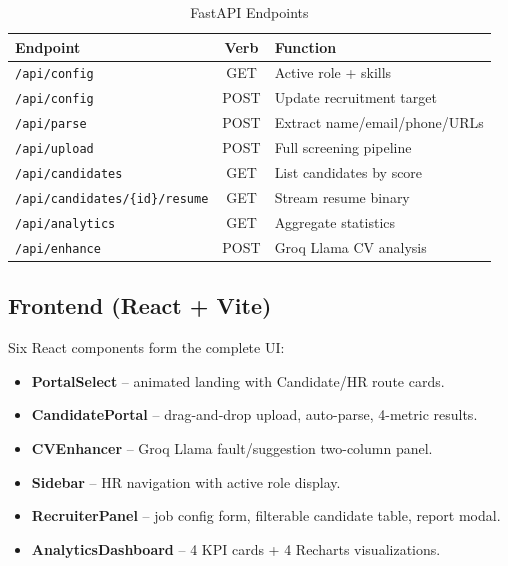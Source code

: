 \documentclass[10pt,twocolumn]{article}
\begin{document}
\begin{table}[H]
\centering
\caption{FastAPI Endpoints}
\label{tab:api}
\small
\setlength{\tabcolsep}{3pt}
\begin{tabular}{@{}L{2.2cm}cL{3.0cm}@{}}
\toprule
{}\textbf{Endpoint} & \textbf{Verb} & \textbf{Function} \\
\midrule
\texttt{/api/config}          & GET   & Active role + skills \\
\texttt{/api/config}          & POST  & Update recruitment target \\
\texttt{/api/parse}           & POST  & Extract name/email/phone/URLs \\
\texttt{/api/upload}          & POST  & Full screening pipeline \\
\texttt{/api/candidates}      & GET   & List candidates by score \\
\texttt{/api/candidates/\{id\}/resume} & GET & Stream resume binary \\
\texttt{/api/analytics}       & GET   & Aggregate statistics \\
\texttt{/api/enhance}         & POST  & Groq Llama CV analysis \\
\bottomrule
\end{tabular}
\end{table}

\subsection{Frontend (React + Vite)}

Six React components form the complete UI:
\begin{itemize}
  \item \textbf{PortalSelect} -- animated landing with Candidate/HR route cards.
  \item \textbf{CandidatePortal} -- drag-and-drop upload, auto-parse, 4-metric results.
  \item \textbf{CVEnhancer} -- Groq Llama fault/suggestion two-column panel.
  \item \textbf{Sidebar} -- HR navigation with active role display.
  \item \textbf{RecruiterPanel} -- job config form, filterable candidate table, report modal.
  \item \textbf{AnalyticsDashboard} -- 4 KPI cards + 4 Recharts visualizations.
\end{itemize}
\end{document}

